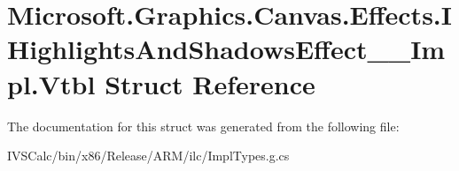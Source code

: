 \hypertarget{struct_microsoft_1_1_graphics_1_1_canvas_1_1_effects_1_1_i_highlights_and_shadows_effect_____impl_1_1_vtbl}{}\section{Microsoft.\+Graphics.\+Canvas.\+Effects.\+I\+Highlights\+And\+Shadows\+Effect\+\_\+\+\_\+\+Impl.\+Vtbl Struct Reference}
\label{struct_microsoft_1_1_graphics_1_1_canvas_1_1_effects_1_1_i_highlights_and_shadows_effect_____impl_1_1_vtbl}


The documentation for this struct was generated from the following file\+:\begin{DoxyCompactItemize}
\item 
I\+V\+S\+Calc/bin/x86/\+Release/\+A\+R\+M/ilc/Impl\+Types.\+g.\+cs\end{DoxyCompactItemize}
